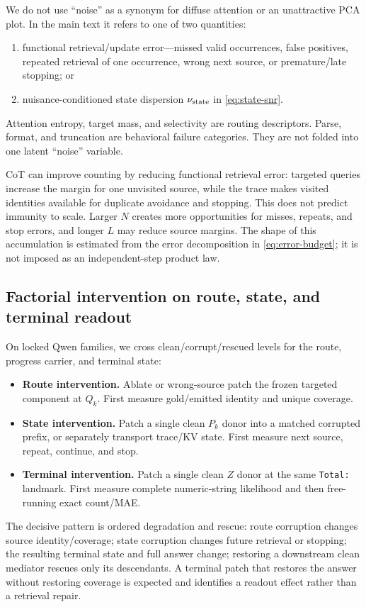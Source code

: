 We do not use ``noise'' as a synonym for diffuse attention or an unattractive
PCA plot. In the main text it refers to one of two quantities:
\begin{enumerate}
  \item functional retrieval/update error---missed valid occurrences, false
  positives, repeated retrieval of one occurrence, wrong next source, or
  premature/late stopping; or
  \item nuisance-conditioned state dispersion
  \(\nu_{\rm state}\) in \cref{eq:state-snr}.
\end{enumerate}
Attention entropy, target mass, and selectivity are routing descriptors.
Parse, format, and truncation are behavioral failure categories. They are not
folded into one latent ``noise'' variable.

CoT can improve counting by reducing functional retrieval error: targeted
queries increase the margin for one unvisited source, while the trace makes
visited identities available for duplicate avoidance and stopping. This does
not predict immunity to scale. Larger \(N\) creates more opportunities for
misses, repeats, and stop errors, and longer \(L\) may reduce source margins.
The shape of this accumulation is estimated from the error decomposition in
\cref{eq:error-budget}; it is not imposed as an independent-step product law.

\subsection{Factorial intervention on route, state, and terminal readout}

On locked Qwen families, we cross clean/corrupt/rescued levels for the route,
progress carrier, and terminal state:
\begin{itemize}
  \item \textbf{Route intervention.} Ablate or wrong-source patch the frozen
  targeted component at \(Q_k\). First measure gold/emitted identity and
  unique coverage.
  \item \textbf{State intervention.} Patch a single clean \(P_k\) donor into a
  matched corrupted prefix, or separately transport trace/KV state. First
  measure next source, repeat, continue, and stop.
  \item \textbf{Terminal intervention.} Patch a single clean \(Z\) donor at
  the same \texttt{Total:} landmark. First measure complete numeric-string
  likelihood and then free-running exact count/MAE.
\end{itemize}
The decisive pattern is ordered degradation and rescue: route corruption
changes source identity/coverage; state corruption changes future retrieval
or stopping; the resulting terminal state and full answer change; restoring a
downstream clean mediator rescues only its descendants. A terminal patch that
restores the answer without restoring coverage is expected and identifies a
readout effect rather than a retrieval repair.

